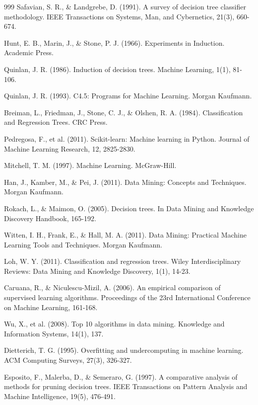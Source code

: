 \begin{thebibliography}{999}
 Safavian, S. R., \& Landgrebe, D. (1991). A survey of decision tree classifier methodology. IEEE Transactions on Systems, Man, and Cybernetics, 21(3), 660-674.

 Hunt, E. B., Marin, J., \& Stone, P. J. (1966). Experiments in Induction. Academic Press.

 Quinlan, J. R. (1986). Induction of decision trees. Machine Learning, 1(1), 81-106.

 Quinlan, J. R. (1993). C4.5: Programs for Machine Learning. Morgan Kaufmann.

 Breiman, L., Friedman, J., Stone, C. J., \& Olshen, R. A. (1984). Classification and Regression Trees. CRC Press.

 Pedregosa, F., et al. (2011). Scikit-learn: Machine learning in Python. Journal of Machine Learning Research, 12, 2825-2830.

 Mitchell, T. M. (1997). Machine Learning. McGraw-Hill.

 Han, J., Kamber, M., \& Pei, J. (2011). Data Mining: Concepts and Techniques. Morgan Kaufmann.

 Rokach, L., \& Maimon, O. (2005). Decision trees. In Data Mining and Knowledge Discovery Handbook, 165-192.

 Witten, I. H., Frank, E., \& Hall, M. A. (2011). Data Mining: Practical Machine Learning Tools and Techniques. Morgan Kaufmann.

 Loh, W. Y. (2011). Classification and regression trees. Wiley Interdisciplinary Reviews: Data Mining and Knowledge Discovery, 1(1), 14-23.

 Caruana, R., \& Niculescu-Mizil, A. (2006). An empirical comparison of supervised learning algorithms. Proceedings of the 23rd International Conference on Machine Learning, 161-168.

 Wu, X., et al. (2008). Top 10 algorithms in data mining. Knowledge and Information Systems, 14(1), 1\lr{--}37.

 Dietterich, T. G. (1995). Overfitting and undercomputing in machine learning. ACM Computing Surveys, 27(3), 326-327.

 Esposito, F., Malerba, D., \& Semeraro, G. (1997). A comparative analysis of methods for pruning decision trees. IEEE Transactions on Pattern Analysis and Machine Intelligence, 19(5), 476-491.


\end{thebibliography}
